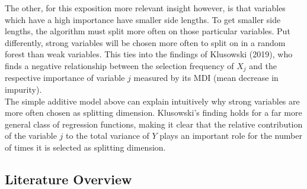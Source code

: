 {The other, for this exposition more relevant insight however, is that variables which have a high importance have smaller side lengths. 
To get smaller side lengths, the algorithm must split more often on those particular variables. 
Put differently, strong variables will be chosen more often to split on in a random forest than weak  variables. 
This ties into the findings of Klusowski (2019), who finds a negative relationship between the selection frequency of $X_j$ and the respective importance of variable $j$ measured by its MDI (mean decrease in impurity). \\

The simple additive model above can explain intuitively why strong variables are more often chosen as splitting dimension.
Klusowski's finding holds for a far more general class of regression functions, making it clear that the relative contribution of the variable $j$ to the total variance of $Y$ plays an important role for the number of times it is selected as splitting dimension.



\subsection{Literature Overview}

}
